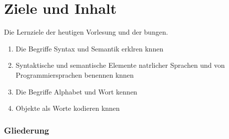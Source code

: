 %
%
%

%
%
%



\subtitle{Text und seine Bedeutung}

\date{6-7 May 2010}




\begin{frame}
  \maketitle
\end{frame}


\section*{Ziele und Inhalt}

\begin{frame}{Die Lernziele der heutigen Vorlesung und der bungen.} 
  \begin{enumerate}
  \item Die Begriffe Syntax und Semantik erklren knnen
  \item Syntaktische und semantische Elemente natrlicher Sprachen und
    von Programmiersprachen benennen knnen
  \item Die Begriffe Alphabet und Wort kennen
  \item Objekte als Worte kodieren knnen
  \end{enumerate}
\end{frame}

\begin{frame}\frametitle<presentation>{Gliederung}
  \tableofcontents
\end{frame}








